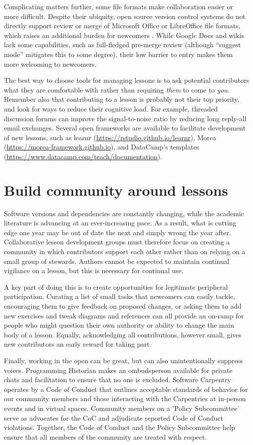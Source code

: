 \documentclass[10pt,letterpaper]{article}
\newcommand{\rulemajor}[2]{\section{#1}\label{#2}}
\begin{document}
Complicating matters further,
some file formats make collaboration easier or more difficult.
Despite their ubiquity,
open source version control systems do not directly support review or merge
of Microsoft Office or LibreOffice file formats,
which raises an additional burden for newcomers \cite{jacobs}.
While Google Docs and wikis lack some capabilities, such as
full-fledged pre-merge review (although ``suggest mode'' 
mitigates this to some degree), 
their low barrier to entry makes them more welcoming to newcomers.

The best way to choose tools for managing lessons is
to ask potential contributors what they are comfortable with
rather than requiring \emph{them} to come to \emph{you}.
Remember also that contributing to a lesson is probably not their top priority,
and look for ways to reduce their cognitive load.
For example,
threaded discussion forums can improve the signal-to-noise ratio
by reducing long reply-all email exchanges.
Several open frameworks are available to facilitate development of new lessons,
such as learnr (\url{https://rstudio.github.io/learnr}),
Morea (\url{https://morea-framework.github.io}),
and DataCamp's templates (\url{https://www.datacamp.com/teach/documentation}).

\rulemajor{Build community around lessons}{community}

Software versions and dependencies are constantly changing,
while the academic literature is advancing at an ever-increasing pace.
As a result,
what is cutting edge one year may be out of date the next and simply wrong the year after.
Collaborative lesson development groups must therefore focus
on creating a community in which contributors support each other
rather than on relying on a small group of stewards.
Authors cannot be expected to maintain continual vigilance on a lesson,
but this is necessary for continual use.

A key part of doing this is to create opportunities for legitimate peripheral participation.
Curating a list of small tasks that newcomers can easily tackle,
encouraging them to give feedback on proposed changes,
or asking them to add new exercises and tweak diagrams and references
can all provide an on-ramp for people who might question their own authority or ability to change the main body of a lesson.
Equally,
acknowledging all contributions,
however small,
gives new contributors an early reward for taking part. 

Finally,
working in the open can be great,
but can also unintentionally suppress voices.
Programming Historian makes an ombudsperson available for private chats and facilitation
to ensure that no one is excluded. Software Carpentry operates by a Code of Conduct that outlines acceptable standards of behavior for our community members and those interacting with the Carpentries at in-person events and in virtual spaces. Community members on a 'Policy Subcommittee' serve as advocates for the CoC and adjudicate reported Code of Conduct violations. Together, the Code of Conduct and the Policy Subcommittee help ensure that all members of the community are treated with respect.
\end{document}

